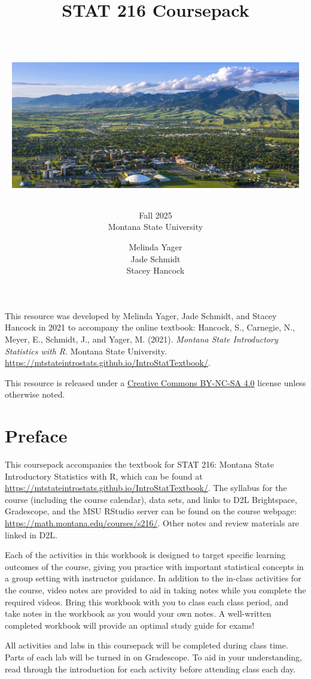 \documentclass[
]{report}
\title{\textbf{STAT 216 Coursepack}\\
\strut \\
\includegraphics[width=5in,height=\textheight,keepaspectratio]{images/msu-campus.jpg}}
\subtitle{Fall 2025\\
Montana State University}
\author{Melinda Yager\\
Jade Schmidt\\
Stacey Hancock}
\date{}
\begin{document}
\maketitle

\newpage
\thispagestyle{empty}

This resource was developed by Melinda Yager, Jade Schmidt, and Stacey Hancock in 2021 to accompany the online textbook: Hancock, S., Carnegie, N., Meyer, E., Schmidt, J., and Yager, M. (2021). \emph{Montana State Introductory Statistics with R}. Montana State University. \url{https://mtstateintrostats.github.io/IntroStatTextbook/}.

This resource is released under a \href{https://creativecommons.org/licenses/by-nc-sa/4.0/}{Creative Commons BY-NC-SA 4.0} license unless otherwise noted.

\setcounter{tocdepth}{1}
\tableofcontents
\thispagestyle{empty}

\newpage
\setcounter{page}{1}

\chapter*{Preface}\label{preface}

This coursepack accompanies the textbook for STAT 216: Montana State Introductory Statistics with R, which can be found at \url{https://mtstateintrostats.github.io/IntroStatTextbook/}. The syllabus for the course (including the course calendar), data sets, and links to D2L Brightspace, Gradescope, and the MSU RStudio server can be found on the course webpage: \url{https://math.montana.edu/courses/s216/}.
Other notes and review materials are linked in D2L.

Each of the activities in this workbook is designed to target specific learning outcomes of the course, giving you practice with important statistical concepts in a group setting with instructor guidance. In addition to the in-class activities for the course, video notes are provided to aid in taking notes while you complete the required videos. Bring this workbook with you to class each class period, and take notes in the workbook as you would your own notes. A well-written completed workbook will provide an optimal study guide for exams!

All activities and labs in this coursepack will be completed during class time. Parts of each lab will be turned in on Gradescope. To aid in your understanding, read through the introduction for each activity before attending class each day.
\end{document}
